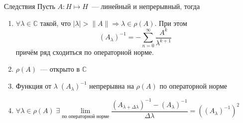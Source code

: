 \documentclass[14pt]{extarticle}
\begin{document}
\begin{MathCl}{Следствия}
    Пусть $A : H \mapsto H$~--- линейный и непрерывный, тогда
    \begin{enumerate}
        \item{$\forall \lambda \in \mathbb C$ такой, что $|\lambda| > \|A\| \Rightarrow  \lambda \in \rho(A)$.
            При этом 
            $$
            (A_\lambda)^{-1} = -\sum \limits_{n = 0}^{\infty}\dfrac{A^k}{\lambda^{k+1}}
            $$
            причём ряд сходиться по операторной норме.}
        \item{$\rho(A)$~--- открыто в $\mathbb C$}
        \item{Функция от $\lambda\; (A_\lambda)^{-1}$ непрерывна на $\rho(A)$ по операторной норме}
        \item{$\forall \lambda \in \rho(A)\; \exists \lim\limits_{\text{по операторной норме}}\dfrac{(A_{\lambda + \Delta \lambda})^{-1} - (A_\lambda)^{-1}}{\Delta\lambda} =
            ((A_\lambda)^{-1})^2$}
    \end{enumerate}
\end{MathCl}
\end{document}
